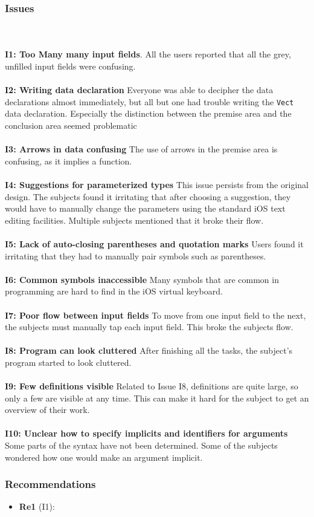 \subsubsection{Issues}
\label{sec:second_issues}
\\ \\
\textbf{I1: Too Many many input fields}.
All the users reported that all the grey, unfilled input fields were confusing.
\\ \\
\textbf{I2: Writing data declaration}
Everyone was able to decipher the data declarations almost immediately, but
all but one had trouble writing the \texttt{Vect} data declaration. Especially
the distinction between the premise area and the conclusion area seemed
problematic
\\ \\
\textbf{I3: Arrows in data confusing}
The use of arrows in the premise area is confusing, as it implies a function.
\\ \\
\textbf{I4: Suggestions for parameterized types}
This issue persists from the original design. The subjects found it irritating
that after choosing a suggestion, they would have to manually change the
parameters using the standard iOS text editing facilities. Multiple subjects
mentioned that it broke their flow.
\\ \\
\textbf{I5: Lack of auto-closing parentheses and quotation marks}
Users found it irritating that they had to manually pair symbols such as
parentheses.
\\ \\
\textbf{I6: Common symbols inaccessible}
Many symbols that are common in programming are hard to find in the iOS virtual
keyboard.
\\ \\
\textbf{I7: Poor flow between input fields}
To move from one input field to the next, the subjects must manually tap each
input field. This broke the subjects flow.
\\ \\
\textbf{I8: Program can look cluttered}
After finishing all the tasks, the subject's program started to look cluttered.
\\ \\
\textbf{I9: Few definitions visible}
Related to Issue I8, definitions are quite large, so only a few are visible at
any time. This can make it hard for the subject to get an overview of their
work.
\\ \\
\textbf{I10: Unclear how to specify implicits and identifiers for arguments}
Some parts of the syntax have not been determined. Some of the subjects
wondered how one would make an argument implicit.

\subsubsection{Recommendations}
\label{sec:second_recommendations}
\begin{itemize}
	\item \textbf{Re1} (I1): 
\end{itemize}
